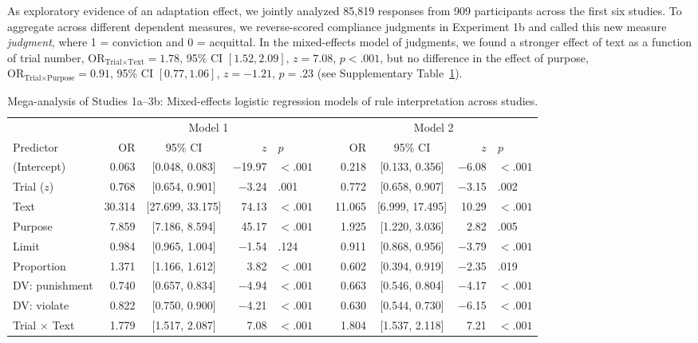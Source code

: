 \documentclass[pdflatex,sn-nature]{sn-jnl}
\begin{document}
\begin{appendices}
As exploratory evidence of an adaptation effect, we jointly analyzed 85,819 responses from 909 participants across the first six studies. To aggregate across different dependent measures, we reverse-scored compliance judgments in Experiment 1b and called this new measure \textit{judgment}, where 1 = conviction and 0 = acquittal. In the mixed-effects model of judgments, we found a stronger effect of text as a function of trial number, $\mathrm{OR}_\text{Trial$\times$Text} = 1.78$, 95\% CI $[1.52, 2.09]$, $z = 7.08$, $p < .001$, but no difference in the effect of purpose, $\mathrm{OR}_\text{Trial$\times$Purpose} = 0.91$, 95\% CI $[0.77, 1.06]$, $z = -1.21$, $p = .23$ (see Supplementary Table~\ref{tab:S12}).

\begin{table}
\caption{Mega-analysis of Studies 1a--3b: Mixed-effects logistic regression models of rule interpretation across studies.}
\label{tab:S12}
\begin{tabular*}{\textheight}{@{\extracolsep{\fill}}lrcrllrcrl@{}}
\toprule
 & \multicolumn{4}{c}{Model 1} & & \multicolumn{4}{c}{Model 2} \\
\cmidrule{2-5} \cmidrule{7-10}
Predictor & OR & 95\% CI & $z$ & $p$ & & OR & 95\% CI & $z$ & $p$ \\
\midrule
(Intercept)              & 0.063 & [0.048, 0.083] & $-$19.97 & $<.001$ && 0.218 & [0.133, 0.356] & $-$6.08 & $<.001$ \\
Trial ($z$)              & 0.768 & [0.654, 0.901] & $-$3.24  & .001   && 0.772 & [0.658, 0.907] & $-$3.15 & .002   \\
Text                     & 30.314& [27.699, 33.175]& 74.13  & $<.001$ && 11.065& [6.999, 17.495]& 10.29  & $<.001$ \\
Purpose                  & 7.859 & [7.186, 8.594] & 45.17   & $<.001$ && 1.925 & [1.220, 3.036] & 2.82   & .005   \\
Limit                    & 0.984 & [0.965, 1.004] & $-$1.54  & .124   && 0.911 & [0.868, 0.956] & $-$3.79 & $<.001$ \\
Proportion               & 1.371 & [1.166, 1.612] & 3.82    & $<.001$ && 0.602 & [0.394, 0.919] & $-$2.35 & .019   \\
DV: punishment           & 0.740 & [0.657, 0.834] & $-$4.94  & $<.001$ && 0.663 & [0.546, 0.804] & $-$4.17 & $<.001$ \\
DV: violate              & 0.822 & [0.750, 0.900] & $-$4.21  & $<.001$ && 0.630 & [0.544, 0.730] & $-$6.15 & $<.001$ \\
Trial $\times$ Text      & 1.779 & [1.517, 2.087] & 7.08    & $<.001$ && 1.804 & [1.537, 2.118] & 7.21   & $<.001$ \\

\end{tabular*}
\end{table}
\end{appendices}
\end{document}
